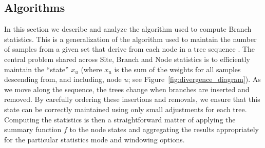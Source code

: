 \documentclass{article}
\begin{document}
\subsection*{Algorithms}
In this section we describe and analyze the algorithm used
to compute Branch statistics. This is a generalization
of the algorithm used to maintain the number of samples from a
given set that derive from each node in a tree
sequence \cite[Algorithm L]{kelleher2016efficient}. The central
problem shared across Site, Branch and Node statistics
is to efficiently maintain the ``state'' $x_u$ (where $x_u$ is the
sum of the weights for all samples descending
from, and including, node $u$; see Figure~\ref{fig:divergence_diagram}).
As we move along the sequence, the trees change when branches are inserted and removed.
By carefully ordering these insertions and removals,
we ensure that this state can be correctly maintained
using only small adjustments for each tree.
Computing the statistics is then a straightforward matter of applying the summary function $f$
to the node states and aggregating the results appropriately for the
particular statistics mode and windowing options.
\end{document}
